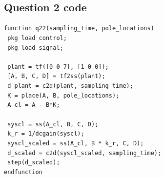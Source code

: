 \documentclass[a4paper, 12pt]{article}
\begin{document}
\begin{appendices}
  \section{Question 2 code}
  \label{sec:appendix_2}
  \texttt{function q22(sampling\_time, pole\_locations)}\\\noindent
  \texttt{\hspace*{1em}  pkg load control;}\\\noindent
  \texttt{\hspace*{1em}  pkg load signal;}\\\noindent
  \texttt{\hspace*{1em}  }\\\noindent
  \texttt{\hspace*{1em}  plant = tf([0 0 7], [1 0 0]);}\\\noindent
  \texttt{\hspace*{1em}  [A, B, C, D] = tf2ss(plant);}\\\noindent
  \texttt{\hspace*{1em}  d\_plant = c2d(plant, sampling\_time);}\\\noindent
  \texttt{\hspace*{1em}  K = place(A, B, pole\_locations);}\\\noindent
  \texttt{\hspace*{1em}  A\_cl = A - B*K;}\\\noindent
  \texttt{\hspace*{1em}  }\\\noindent
  \texttt{\hspace*{1em}  syscl = ss(A\_cl, B, C, D);}\\\noindent
  \texttt{\hspace*{1em}  k\_r = 1/dcgain(syscl);}\\\noindent
  \texttt{\hspace*{1em}  syscl\_scaled = ss(A\_cl, B * k\_r, C, D);}\\\noindent
  \texttt{\hspace*{1em}  d\_scaled = c2d(syscl\_scaled, sampling\_time);}\\\noindent
  \texttt{\hspace*{1em}  step(d\_scaled);}\\\noindent
  \texttt{endfunction}\\\noindent

\end{appendices}
\end{document}
